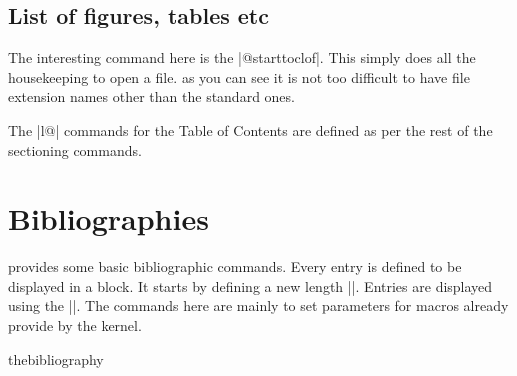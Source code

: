 \subsection*{List of figures, tables etc}
\begin{teX}
\newcommand\listoffigures{%
    \if@twocolumn
      \@restonecoltrue\onecolumn
    \else
      \@restonecolfalse
    \fi
    \chapter*{\listfigurename}%
      \@mkboth{\MakeUppercase\listfigurename}%
              {\MakeUppercase\listfigurename}%
    \@starttoc{lof}%
    \if@restonecol\twocolumn\fi
    }
\end{teX}
The interesting command here is the |@starttoc{lof}|. This simply does all the housekeeping to open a file. as you can see it is not too difficult to have file extension names other than the standard ones.

The |l@| commands for the Table of Contents are defined as per the rest of the sectioning commands.

\begin{teX}
\newcommand*\l@figure{\@dottedtocline{1}{1.5em}{2.3em}}
\newcommand\listoftables{%
    \if@twocolumn
      \@restonecoltrue\onecolumn
    \else
      \@restonecolfalse
    \fi
    \chapter*{\listtablename}%
      \@mkboth{%
          \MakeUppercase\listtablename}%
         {\MakeUppercase\listtablename}%
    \@starttoc{lot}%
    \if@restonecol\twocolumn\fi
    }
\let\l@table\l@figure
\end{teX}

\section*{Bibliographies}

\begin{multicols}{2}
\latex provides some basic bibliographic commands. Every entry is defined to be displayed in a block. It starts by defining a new length |\bibindent|. Entries are displayed using the  |\list|. The commands here are mainly to set parameters for macros already provide by the kernel.
\end{multicols}

\begin{docEnvironment}{thebibliography}{}
\end{docEnvironment}

